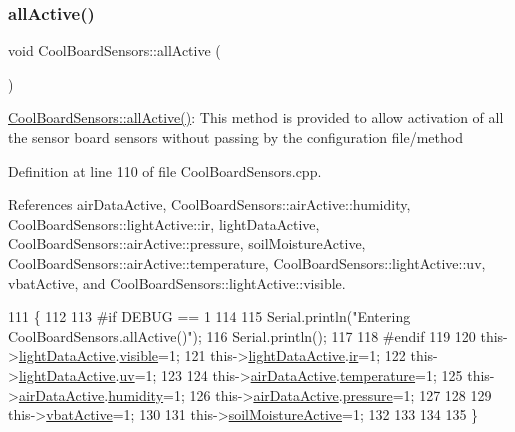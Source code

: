 \subsubsection{\texorpdfstring{all\+Active()}{allActive()}}
{\footnotesize\ttfamily void Cool\+Board\+Sensors\+::all\+Active (\begin{DoxyParamCaption}{ }\end{DoxyParamCaption})}

\hyperlink{classCoolBoardSensors_aa432c5aac88f89c31a10766390f23e0b}{Cool\+Board\+Sensors\+::all\+Active()}\+: This method is provided to allow activation of all the sensor board sensors without passing by the configuration file/method 

Definition at line 110 of file Cool\+Board\+Sensors.\+cpp.



References air\+Data\+Active, Cool\+Board\+Sensors\+::air\+Active\+::humidity, Cool\+Board\+Sensors\+::light\+Active\+::ir, light\+Data\+Active, Cool\+Board\+Sensors\+::air\+Active\+::pressure, soil\+Moisture\+Active, Cool\+Board\+Sensors\+::air\+Active\+::temperature, Cool\+Board\+Sensors\+::light\+Active\+::uv, vbat\+Active, and Cool\+Board\+Sensors\+::light\+Active\+::visible.


\begin{DoxyCode}
111 \{
112 
113 \textcolor{preprocessor}{#if DEBUG == 1 }
114 
115     Serial.println(\textcolor{stringliteral}{"Entering CoolBoardSensors.allActive()"});
116     Serial.println();
117 
118 \textcolor{preprocessor}{#endif}
119     
120     this->\hyperlink{classCoolBoardSensors_ac4deb1cf41bac8b91c780c92fab00ba4}{lightDataActive}.\hyperlink{structCoolBoardSensors_1_1lightActive_abcbba296b6a95e67c0cd2555d9dd50c7}{visible}=1;
121     this->\hyperlink{classCoolBoardSensors_ac4deb1cf41bac8b91c780c92fab00ba4}{lightDataActive}.\hyperlink{structCoolBoardSensors_1_1lightActive_a67700895349b95ceb263f1a6da756315}{ir}=1;
122     this->\hyperlink{classCoolBoardSensors_ac4deb1cf41bac8b91c780c92fab00ba4}{lightDataActive}.\hyperlink{structCoolBoardSensors_1_1lightActive_a949a7aaf5166d981de8fe0fd93da20d6}{uv}=1;    
123 
124     this->\hyperlink{classCoolBoardSensors_abff8dfeccb2f7689847bb64d5f1cd31e}{airDataActive}.\hyperlink{structCoolBoardSensors_1_1airActive_a9a6633c426b0508e30ebc1832ec6d745}{temperature}=1;
125     this->\hyperlink{classCoolBoardSensors_abff8dfeccb2f7689847bb64d5f1cd31e}{airDataActive}.\hyperlink{structCoolBoardSensors_1_1airActive_ae5740445054b27415e22f450576accb7}{humidity}=1;
126     this->\hyperlink{classCoolBoardSensors_abff8dfeccb2f7689847bb64d5f1cd31e}{airDataActive}.\hyperlink{structCoolBoardSensors_1_1airActive_ab200826a70d1dc9945f5efb6b9c732ed}{pressure}=1;
127 
128 
129     this->\hyperlink{classCoolBoardSensors_af5039ad760b0ff0aa7eee16c55e81702}{vbatActive}=1;
130 
131     this->\hyperlink{classCoolBoardSensors_a31983eecc0f9cd000e1f912206ea4dc8}{soilMoistureActive}=1;
132     
133 
134 
135 \}
\end{DoxyCode}
\mbox{\label{classCoolBoardSensors_a97095823ef7c8f5290812f1405b966b3}} 
